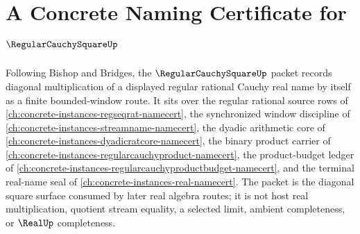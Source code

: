 \chapter{A Concrete Naming Certificate for $\RegularCauchySquareUp$}
\label{ch:concrete-instances-regular-cauchy-square-namecert}

Following Bishop and Bridges, the $\RegularCauchySquareUp$ packet records diagonal multiplication of a displayed regular rational Cauchy real name by itself as a finite bounded-window route. It sits over the regular rational source rows of \autoref{ch:concrete-instances-regseqrat-namecert}, the synchronized window discipline of \autoref{ch:concrete-instances-streamname-namecert}, the dyadic arithmetic core of \autoref{ch:concrete-instances-dyadicratcore-namecert}, the binary product carrier of \autoref{ch:concrete-instances-regularcauchyproduct-namecert}, the product-budget ledger of \autoref{ch:concrete-instances-regularcauchyproductbudget-namecert}, and the terminal real-name seal of \autoref{ch:concrete-instances-real-namecert}. The packet is the diagonal square surface consumed by later real algebra routes; it is not host real multiplication, quotient stream equality, a selected limit, ambient completeness, or $\RealUp$ completeness.

